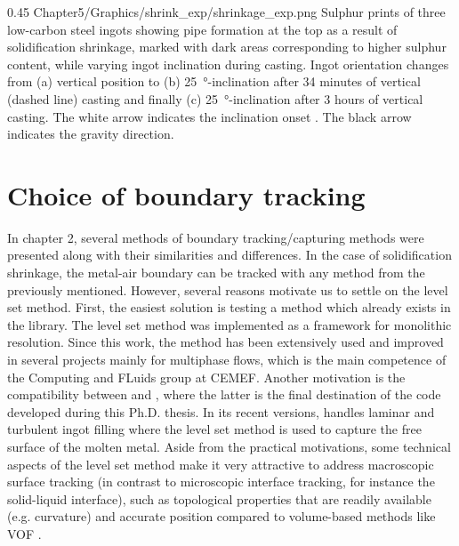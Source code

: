 \begin{figureth}
{0.45}
{Chapter5/Graphics/shrink_exp/shrinkage_exp.png}
{Sulphur prints of three low-carbon steel ingots showing pipe formation at the top as a result 
of solidification shrinkage, marked with dark areas corresponding to higher sulphur content, while varying ingot inclination during casting.
Ingot orientation changes from (a) vertical position to (b) \SI{25}{\degree}-inclination after 34 minutes of vertical (dashed line) casting and finally (c) \SI{25}{\degree}-inclination after 3 hours of vertical casting. The white arrow indicates the inclination onset \citep{onodera_effect_1959}. The black arrow indicates the gravity direction.}
\label{fig:shrinkage_exp}
\end{figureth}
%
%
\section{Choice of boundary tracking}
In chapter 2, several methods of boundary tracking/capturing methods were presented 
along with their similarities and differences. In the case of solidification shrinkage,
the metal-air boundary can be tracked with any method from the previously mentioned.
However, several reasons motivate us to settle on the level set method. 
First, the easiest solution is testing a method which already exists in the \cimlib library.
The level set method was implemented as a framework for monolithic resolution. Since this work,
the method has been extensively used and improved in several projects mainly for multiphase flows, which is the 
main competence of the Computing and FLuids group at CEMEF. Another motivation is the compatibility
between \cimlib and \thercast, where the latter is the final destination of the code developed during this Ph.D. thesis.
In its recent versions, \thercast handles laminar and turbulent ingot filling where the level set method is used 
to capture the free surface of the molten metal. Aside from the practical motivations, some technical aspects of the level
set method make it very attractive to address macroscopic surface tracking 
(in contrast to microscopic interface tracking, for instance the solid-liquid interface), 
such as topological properties that are readily available (e.g. curvature)
and accurate position compared to volume-based methods like VOF \citep{sethian_level_1999}.
%

